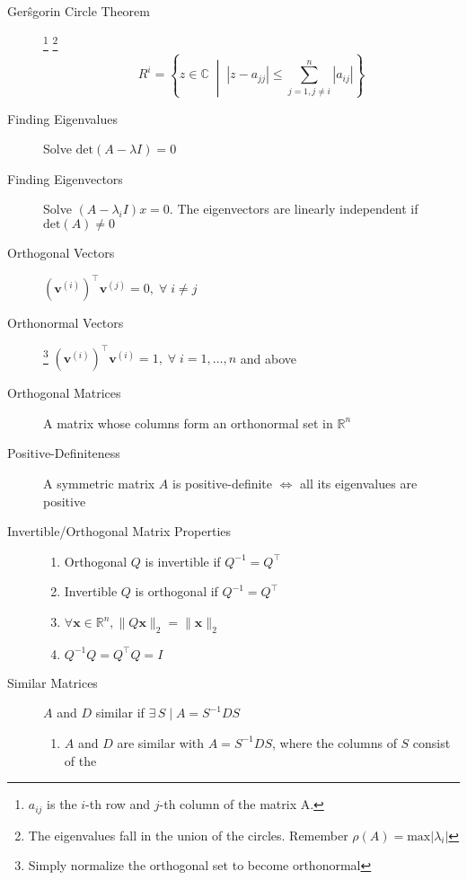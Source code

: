 \documentclass[8pt]{article}
\begin{document}

\begin{multicols}{2}
  \begin{description}
  \item[Ger\^{s}gorin Circle Theorem] \footnote{$a_{ij}$ is the $i$-th row and $j$-th column of the
      matrix A.}  \footnote{The eigenvalues fall in the union of the circles. Remember
      $\rho(A)=\text{max}|\lambda_i|$}
    $$R^i=\left\{z\in\mathbb{C} \;\middle|\; |z-a_{jj}|\leq\sum_{j=1,j\neq i}^{n}|a_{ij}|\right\}$$
  \item[Finding Eigenvalues] Solve $\mathrm{det}(A-\lambda I)=0$
  \item[Finding Eigenvectors] Solve $(A-\lambda_iI)x=0$. The eigenvectors are linearly independent
    if $\mathrm{det}(A)\neq 0$
  \item[Orthogonal Vectors]
    $(\mathbf{v}^{(i)})^\top\mathbf{v}^{(j)}=0, \;\forall\; i\neq j$
  \item[Orthonormal Vectors]
    \footnote{Simply normalize the orthogonal set to become orthonormal}
    $(\mathbf{v}^{(i)})^\top\mathbf{v}^{(i)}=1, \;\forall\; i=1,\dots,n$ and above
  \item[Orthogonal Matrices] A matrix whose columns form an orthonormal set in $\mathbb{R}^n$
  \item[Positive-Definiteness] A symmetric matrix $A$ is positive-definite $\iff$ all its
    eigenvalues are positive
  \item[Invertible/Orthogonal Matrix Properties] \hfill
    \begin{enumerate}[i]
    \item Orthogonal $Q$ is invertible if $Q^{-1}=Q^\top$
    \item Invertible $Q$ is orthogonal if $Q^{-1}=Q^\top$
    \item $\forall\mathbf{x} \in \mathbb{R}^n,\|Q\mathbf{x}\|_2=\|\mathbf{x}\|_2$
    \item $Q^{-1}Q=Q^\top Q=I$
    \end{enumerate}
  \item[Similar Matrices] $A$ and $D$ similar if $\exists\,S\;|\;A=S^{-1}DS$
    \begin{enumerate}[i]
    \item $A$ and $D$ are similar with $A = S^{−1}DS$, where the columns of $S$ consist of the

\end{enumerate}
\end{description}
\end{multicols}
\end{document}

